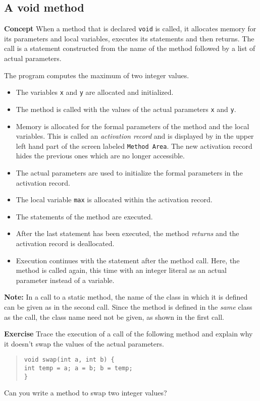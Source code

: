 \subsection{A void method}\label{method.01}

\textbf{Concept} When a method that is declared \texttt{void} is called,
it allocates memory for its parameters and local variables, executes
its statements and then returns. The call is a statement constructed
from the name of the method followed by a list of actual parameters.


The program computes the maximum of two integer values.

\begin{itemize}
\item The variables \texttt{x} and \texttt{y} are allocated and initialized.
\item The method is called with the values of the actual parameters \texttt{x} and \texttt{y}.
\item Memory is allocated for the formal parameters of the method and the local variables.
This is called an \emph{activation record} and is displayed by \jel{} in the upper left
hand part of the screen labeled \texttt{Method Area}. The new activation record hides
the previous ones which are no longer accessible.
\item The actual parameters are used to initialize the formal parameters in the activation
record.
\item The local variable \texttt{max} is allocated within the activation record.
\item The statements of the method are executed.
\item After the last statement has been executed, the method \emph{returns}
and the activation record is deallocated.
\item Execution continues with the statement after the method call.
Here, the method is called again, this time with an integer literal
as an actual parameter instead of a variable. 
\end{itemize}
\textbf{Note:} In a call to a static method, the name of the 
class in which it is defined can be given as in the second call.
Since the method is defined in the \emph{same} class as the call,
the class name need not be given, as shown in the first call.

\textbf{Exercise} Trace the execution of a call of the following method and
explain why it doesn't swap the values of the actual parameters.
\begin{quote}
\texttt{void swap(int a, int b) \{}\\
\hspace*{2em}\texttt{int temp = a; a = b; b = temp;}\\
\texttt{\}}
\end{quote}
Can you write a method to swap two integer values?
